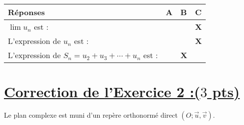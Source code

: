 \documentclass[12pt,a4paper]{article}
\begin{document}
\begin{enumerate}
          \begin{center}
              \renewcommand{\arraystretch}{1.5}
              \begin{tabular}{|>{\centering\arraybackslash}m{5cm}|>{\centering\arraybackslash}m{3cm}|>{\centering\arraybackslash}m{3cm}|>{\centering\arraybackslash}m{3cm}|}
                  \hline
                  \textbf{Réponses}                                          & \textbf{A} & \textbf{B} & \textbf{C} \\
                  \hline
                  \( \lim u_n \) est :                                       &            &            & \textbf{X} \\
                  \hline
                  L’expression de \( u_n \) est :                            &            &            & \textbf{X} \\
                  \hline
                  L’expression de \( S_n = u_2 + u_3 + \cdots + u_n \) est : &            & \textbf{X} &            \\
                  \hline
              \end{tabular}
          \end{center}

\end{enumerate}

\section*{\underline{Correction de l'Exercice 2 :($3$ pts)}}
Le plan complexe est muni d’un repère orthonormé direct \( (O ; \vec{u}, \vec{v}) \).
\end{document}
